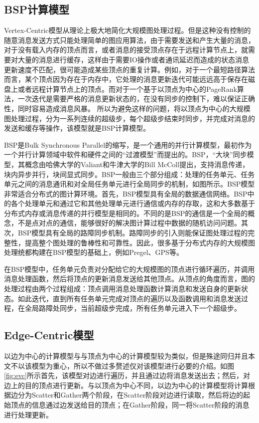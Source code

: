 \subsection{BSP计算模型}
Vertex-Centric模型从理论上极大地简化大规模图处理过程。但是这种没有控制的随意消息发送方式只能处理简单的图应用算法，由于需要发送和产生大量的消息，对于没有载入内存的顶点而言，或者消息的接受顶点存在于远程计算节点上，就需要对大量的消息进行缓存，这样由于需要IO操作或者通讯延迟而造成的状态消息更新速度不匹配，很可能造成某些顶点的重复计算。例如，对于一个最短路径算法而言，某个顶点因为存在于内存中，它处理的消息更新迭代可能远远高于保存在磁盘上或者远程计算节点上的顶点。而对于一个基于以顶点为中心的PageRank算法，一次迭代是需要严格的消息更新状态的，在没有同步的控制下，难以保证正确性，同时容易造成消息风暴。
所以为避免这样的问题，将以顶点为中心的大规模图处理过程，分为一系列连续的超级步，每个超级步结束时同步，并完成对消息的发送和缓存等操作，该模型就是BSP计算模型。

BSP是Bulk Synchronous Parallel的缩写，是一个通用的并行计算模型，最初作为一个并行计算领域中软件和硬件之间的“过渡模型”而提出的。BSP，“大块”同步模型，其概念由哈佛大学的Valiant和牛津大学的Bill McColl提出，支持消息传递，块内异步并行，块间显式同步。BSP一般由三个部分组成：处理的任务单元、任务单元之间的消息通讯和对全局任务单元进行全局同步的机制，如图所示。BSP模型非常适合分布式的图计算环境。首先，BSP模型具有全局的数据通信网络。BSP中的各个处理单元和通过它和其他处理单元进行通信或内存的存取，这和大多数基于分布式内存或消息传递的并行模型是相同的。不同的是BSP的通信是一个全局的概念，不是点对点的通信，能够很好的解决图计算过程中数据的随机访问问题。其次，BSP模型具有全局的路障同步机制。路障同步的引入则能保证图处理过程的完整性，提高整个图处理的鲁棒性和可靠性。因此，很多基于分布式内存的大规模图处理统都构建在BSP模型的基础上，例如Pregel、GPS等。

在BSP模型中，任务单元负责对分配给它的大规模图的顶点进行循环遍历，并调用消息处理函数，然后将顶点的更新消息发送给其他顶点。从顶点的角度而言，图的处理过程由两个过程组成：顶点调用消息处理函数计算消息和发送自身的更新状态。如此迭代，直到所有任务单元完成对顶点的遍历以及函数调用和消息发送过程，在全局路障处同步，当前超级步完成，所有任务单元进入下一个超级步。

\subsection{Edge-Centric模型}
以边为中心的计算模型与与顶点为中心的计算模型较为类似，但是殊途同归并且本文不以该模型为重心，所以不做过多赘述仅对该模型进行必要的介绍。如图\ref{fig:evc}所示首先，该模型对边进行遍历，并且通过边将消息发送出去；然后，对边上的目的顶点进行更新。与以顶点为中心不同，以边为中心的计算模型将计算根据边分为Scatter和Gather两个阶段，在Scatter阶段对边进行读取，然后将边的起始顶点的信息通过边发送给目的顶点；在Gather阶段，同一将Scatter阶段的消息进行处理更新。

